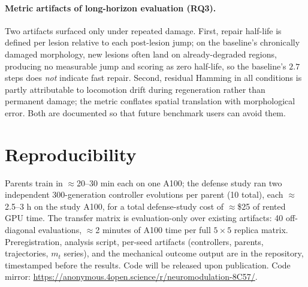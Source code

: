 \documentclass{article}
\begin{document}
\paragraph{Metric artifacts of long-horizon evaluation (RQ3).}
Two artifacts surfaced only under repeated damage. First, repair half-life is
defined per lesion relative to each post-lesion jump; on the baseline's
chronically damaged morphology, new lesions often land on already-degraded
regions, producing no measurable jump and scoring as zero half-life, so the
baseline's $2.7$ steps does \emph{not} indicate fast repair. Second,
residual Hamming in all conditions is partly attributable to locomotion drift
during regeneration rather than permanent damage; the metric conflates
spatial translation with morphological error. Both are documented so that
future benchmark users can avoid them.

\section{Reproducibility}
\label{app:repro}

Parents train in $\approx$20--30 min each on one A100; the defense study
ran two independent 300-generation controller evolutions per parent (10
total), each $\approx$2.5--3 h on the study A100, for a total
defense-study cost of $\approx$\$25 of rented GPU time. The transfer
matrix is evaluation-only over existing artifacts: 40 off-diagonal
evaluations, $\approx$2 minutes of A100 time per full $5{\times}5$ replica
matrix. Preregistration,
analysis script, per-seed artifacts (controllers,
parents, trajectories, $m_t$ series), and the mechanical outcome output are
in the repository, timestamped before the results. Code will be released
upon publication. Code mirror: \url{https://anonymous.4open.science/r/neuromodulation-8C57/}.
\end{document}

